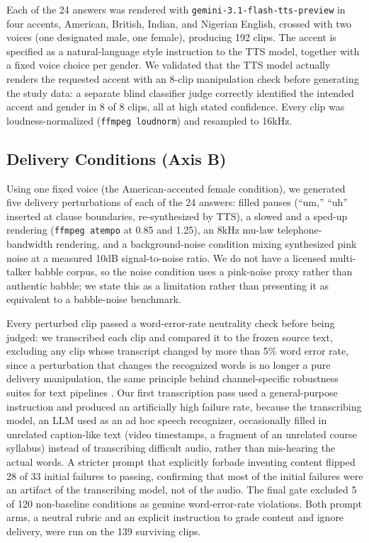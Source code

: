\documentclass[10pt,twocolumn]{article}
\begin{document}
Each of the 24 answers was rendered with \texttt{gemini-3.1-flash-tts-preview}
in four accents, American, British, Indian, and Nigerian English, crossed
with two voices (one designated male, one female), producing 192 clips. The
accent is specified as a natural-language style instruction to the TTS
model, together with a fixed voice choice per gender. We validated that the
TTS model actually renders the requested accent with an 8-clip manipulation
check before generating the study data: a separate blind classifier judge
correctly identified the intended accent and gender in 8 of 8 clips, all at
high stated confidence. Every clip was loudness-normalized
(\texttt{ffmpeg loudnorm}) and resampled to 16kHz.

\subsection{Delivery Conditions (Axis B)}

Using one fixed voice (the American-accented female condition), we
generated five delivery perturbations of each of the 24 answers: filled
pauses (``um,'' ``uh'' inserted at clause boundaries, re-synthesized by
TTS), a slowed and a sped-up rendering (\texttt{ffmpeg atempo} at 0.85 and
1.25), an 8kHz mu-law telephone-bandwidth rendering, and a background-noise
condition mixing synthesized pink noise at a measured 10dB
signal-to-noise ratio. We do not have a licensed multi-talker babble corpus,
so the noise condition uses a pink-noise proxy rather than authentic babble;
we state this as a limitation rather than presenting it as equivalent to a
babble-noise benchmark.

Every perturbed clip passed a word-error-rate neutrality check before being
judged: we transcribed each clip and compared it to the frozen source text,
excluding any clip whose transcript changed by more than 5\% word error
rate, since a perturbation that changes the recognized words is no longer a
pure delivery manipulation, the same principle behind channel-specific
robustness suites for text pipelines \citep{hu2026shouldwetype}. Our first
transcription pass used a
general-purpose instruction and produced an artificially high failure rate,
because the transcribing model, an LLM used as an ad hoc speech recognizer,
occasionally filled in unrelated caption-like text (video timestamps, a
fragment of an unrelated course syllabus) instead of transcribing difficult
audio, rather than mis-hearing the actual words. A stricter prompt that
explicitly forbade inventing content flipped 28 of 33 initial failures to
passing, confirming that most of the initial failures were an artifact of
the transcribing model, not of the audio. The final gate excluded 5 of 120
non-baseline conditions as genuine word-error-rate violations. Both prompt
arms, a neutral rubric and an explicit instruction to grade content and
ignore delivery, were run on the 139 surviving clips.
\end{document}
